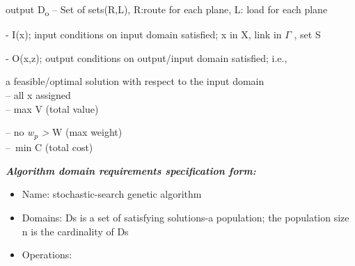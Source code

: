 \documentclass[12pt]{article}
\renewcommand{\_}{\kern-1.5pt\textunderscore\kern-1.5pt}
\begin{document}
\begin{adjustwidth}{0.5in}{0.0in}
\tab output D\textsubscript{o }– Set of sets(R,L), R:route for each plane, L: load for each plane\par

\end{adjustwidth}

\begin{adjustwidth}{0.5in}{0.0in}
- I(x); input conditions on input domain satisﬁed; x in X, link in $ \Gamma $ , set S \par

\end{adjustwidth}

\begin{adjustwidth}{0.5in}{0.0in}
- O(x,z); output conditions on output/input domain satisﬁed; i.e., \par

\end{adjustwidth}

\setlength{\parskip}{18.12pt}
\begin{adjustwidth}{0.5in}{0.0in}
\tab a feasible/optimal solution with respect to the input domain \\
-- all x assigned\\
-- max V (total value)\par

\end{adjustwidth}

\begin{adjustwidth}{0.25in}{0.0in}
-- no \textit{w\textsubscript{p} > }W (max weight)\\
--\ min C (total cost)  \par

\end{adjustwidth}


\vspace{\baselineskip}
\setlength{\parskip}{8.04pt}
\textbf{\textit{Algorithm domain requirements specification form:}}\par

\begin{itemize}
	\item Name: stochastic-search genetic algorithm\par

	\item Domains: Ds is a set of satisfying solutions-a population; the population size n is the cardinality of Ds\par

	\item Operations:
\end{itemize}\par
\end{document}
